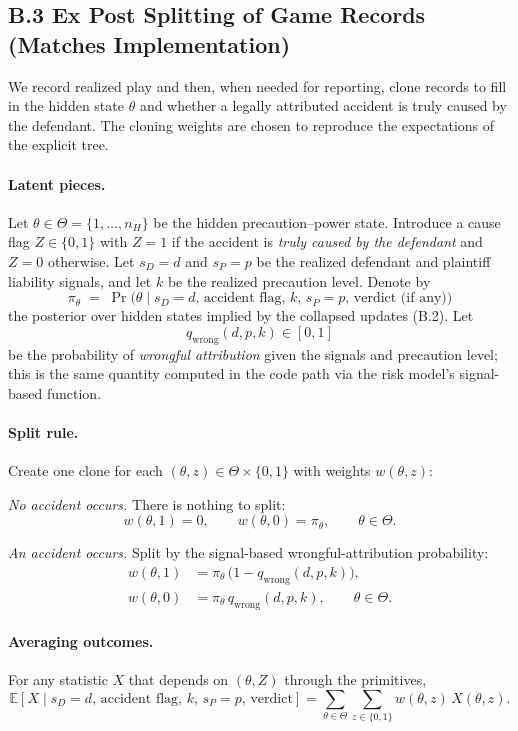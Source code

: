 \documentclass{article}
\begin{document}
\subsection*{B.3 Ex Post Splitting of Game Records (Matches Implementation)}

We record realized play and then, when needed for reporting, clone records to fill in the hidden state $\theta$ and whether a legally attributed accident is truly caused by the defendant. The cloning weights are chosen to reproduce the expectations of the explicit tree.

\paragraph{Latent pieces.}
Let $\theta\in\Theta=\{1,\dots,n_H\}$ be the hidden precaution--power state. Introduce a cause flag $Z\in\{0,1\}$ with $Z=1$ if the accident is \emph{truly caused by the defendant} and $Z=0$ otherwise. Let $s_D=d$ and $s_P=p$ be the realized defendant and plaintiff liability signals, and let $k$ be the realized precaution level. Denote by
\[
\pi_\theta \;=\; \Pr\!\bigl(\theta \mid s_D=d,\,\text{accident flag},\,k,\,s_P=p,\,\text{verdict (if any)}\bigr)
\]
the posterior over hidden states implied by the collapsed updates (B.2). Let
\[
q_{\mathrm{wrong}}(d,p,k)\in[0,1]
\]
be the probability of \emph{wrongful attribution} given the signals and precaution level; this is the same quantity computed in the code path via the risk model’s signal-based function.

\paragraph{Split rule.}
Create one clone for each $(\theta,z)\in\Theta\times\{0,1\}$ with weights $w(\theta,z)$:

\emph{No accident occurs.} There is nothing to split:
\[
w(\theta,1)=0,\qquad w(\theta,0)=\pi_\theta,\qquad \theta\in\Theta.
\]

\emph{An accident occurs.} Split by the signal-based wrongful-attribution probability:
\begin{align*}
w(\theta,1) &= \pi_\theta\,\bigl(1 - q_{\mathrm{wrong}}(d,p,k)\bigr),\\
w(\theta,0) &= \pi_\theta\, q_{\mathrm{wrong}}(d,p,k), \qquad \theta\in\Theta.
\end{align*}

\paragraph{Averaging outcomes.}
For any statistic $X$ that depends on $(\theta,Z)$ through the primitives,
\[
\mathbb{E}\!\left[X \mid s_D=d,\,\text{accident flag},\,k,\,s_P=p,\,\text{verdict}\right]
=\sum_{\theta\in\Theta}\sum_{z\in\{0,1\}} w(\theta,z)\,X(\theta,z).
\]
\end{document}
